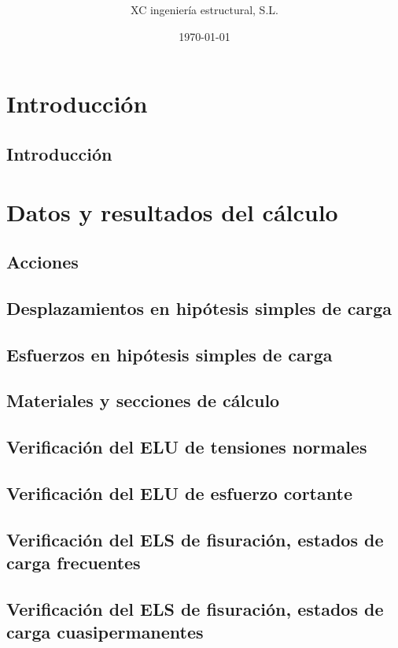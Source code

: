 \documentclass[spanish, a3paper,twoside]{xc_project_a3}
\title{\underline{\textbf{\titDoc}}}
\author{XC ingeniería estructural, S.L.}
\date{\today}
\newcommand{\ncols}{3}
\begin{document}
\maketitle

\newpage
\newenvironment{Figure}
  {\par\medskip\noindent\minipage{\linewidth}}
  {\endminipage\par\medskip}
  
\twocolumn
 
\tableofcontents
\listoftables
\listoffigures
\newpage
\chapter{Introducción}
\section{Introducción}

\chapter{Datos y resultados del cálculo}\label{result_calc}
\section{Acciones}\label{fig_acciones}

\clearpage
\section{Desplazamientos en hipótesis simples de carga}

\clearpage
\section{Esfuerzos en hipótesis simples de carga}

\clearpage
\section{Materiales y secciones de cálculo}

\clearpage
\section{Verificación del ELU de tensiones normales}

\clearpage
\section{Verificación del ELU de esfuerzo cortante}

\clearpage
\section{Verificación del ELS de fisuración, estados de carga frecuentes}

\clearpage
\section{Verificación del ELS de fisuración, estados de carga cuasipermanentes}

\clearpage
\end{document}
